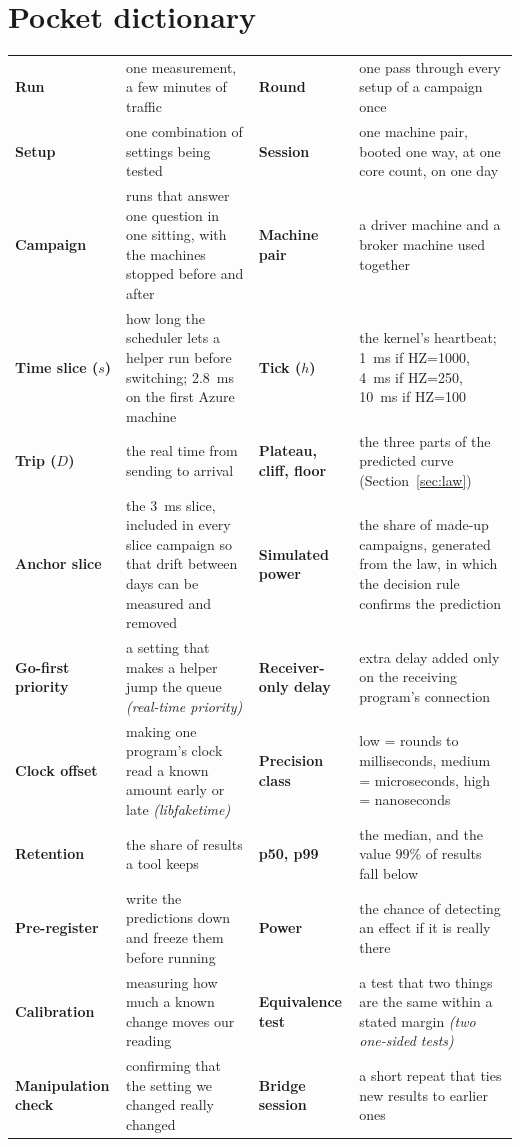 \documentclass[11pt]{article}
\newcommand{\gl}[1]{{\color{soft}\itshape\small (#1)}}
\begin{document}
\section*{Pocket dictionary}
{\small
\begin{tabularx}{\linewidth}{@{}>{\bfseries}p{3.1cm} X >{\bfseries}p{3.1cm} X@{}}
Run & one measurement, a few minutes of traffic & Round & one pass through every setup of a campaign once \\
Setup & one combination of settings being tested & Session & one machine pair, booted one way, at one core count, on one day \\
Campaign & runs that answer one question in one sitting, with the machines stopped before and after & Machine pair & a driver machine and a broker machine used together \\
Time slice ($s$) & how long the scheduler lets a helper run before switching; 2.8~ms on the first Azure machine & Tick ($h$) & the kernel's heartbeat; 1~ms if HZ=1000, 4~ms if HZ=250, 10~ms if HZ=100 \\
Trip ($D$) & the real time from sending to arrival & Plateau, cliff, floor & the three parts of the predicted curve (Section~\ref{sec:law}) \\
Anchor slice & the 3~ms slice, included in every slice campaign so that drift between days can be measured and removed & Simulated power & the share of made-up campaigns, generated from the law, in which the decision rule confirms the prediction \\
Go-first priority & a setting that makes a helper jump the queue \gl{real-time priority} & Receiver-only delay & extra delay added only on the receiving program's connection \\
Clock offset & making one program's clock read a known amount early or late \gl{libfaketime} & Precision class & low = rounds to milliseconds, medium = microseconds, high = nanoseconds \\
Retention & the share of results a tool keeps & p50, p99 & the median, and the value 99\% of results fall below \\
Pre-register & write the predictions down and freeze them before running & Power & the chance of detecting an effect if it is really there \\
Calibration & measuring how much a known change moves our reading & Equivalence test & a test that two things are the same within a stated margin \gl{two one-sided tests} \\
Manipulation check & confirming that the setting we changed really changed & Bridge session & a short repeat that ties new results to earlier ones \\

\end{tabularx}}
\end{document}
